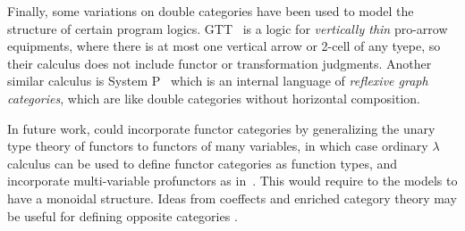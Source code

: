 \documentclass{llncs}
\begin{document}
Finally, some variations on double categories have been used to model
the structure of certain program
logics. GTT~\cite{double-cats-gradual-typing} is a logic for
\emph{vertically thin} pro-arrow equipments, where there is at most
one vertical arrow or 2-cell of any tyepe, so their calculus does not
include functor or transformation judgments. Another similar calculus
is System P~\cite{dunphyreddy} which is an internal language of
\emph{reflexive graph categories}, which are like double categories
without horizontal composition.


In future work, \vett{} could incorporate functor categories by
generalizing the unary type theory of functors to functors of many
variables, in which case ordinary $\lambda$ calculus can be used to
define functor categories as function types, and incorporate
multi-variable profunctors as in~\cite{frey}. This would require to
the models to have a monoidal structure. Ideas from coeffects and
enriched category theory may be useful for defining opposite
categories \cite{Shulman18,coeffect}.



\end{document}
